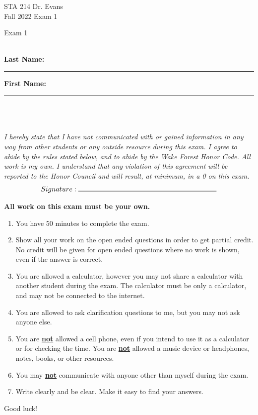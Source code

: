 \documentclass[11pt]{article}
\newcommand{\hl}[1]{\textbf{\underline{#1}}}
\begin{document}
\begin{titlepage}

\enlargethispage{\baselineskip}


STA 214 \hfill Dr. Evans \\
Fall 2022	\hfill Exam 1\\

\vspace{-2cm}

\begin{center}
{\Huge Exam 1}	
\end{center}

$\:$ \\

\textbf{Last Name:} \rule{5cm}{0.5pt}	\hfill	 \textbf{First Name:}  \rule{5cm}{0.5pt}	 \\
$\:$ \\
$\:$ \\

\textit{I hereby state that I have not communicated with or gained information in any way from other students or any outside resource during this exam. I agree to abide by the rules stated below, and to abide by the Wake Forest Honor Code. All work is my own. I understand that any violation of this agreement will be reported to the Honor Council and will result, at minimum, in a 0 on this exam.}
\[ Signature: \rule{7cm}{0.5pt}\]

\hdashrule[0.5ex]{\textwidth}{0.5pt}{3mm}

\textbf{All work on this exam must be your own.}

{\small
\begin{enumerate}
\item You have 50 minutes to complete the exam.
\item Show all your work on the open ended questions in order to get partial credit. No credit will be given for open ended questions where no work is shown, even if the answer is correct.
\item You are allowed a calculator, however you may not share a calculator with another student during the exam. The calculator must be only a calculator, and may not be connected to the internet. 
\item You are allowed to ask clarification questions to me, but you may not ask anyone else. 
\item You are \hl{not} allowed a cell phone, even if you intend to use it as a calculator or for checking the time. You are \hl{not} allowed a music device or headphones, notes, books, or other resources. 
\item You may \hl{not} communicate with anyone other than myself during the exam.
\item Write clearly and be clear. Make it easy to find your answers. 
\end{enumerate}
}
\begin{center}
{\Large Good luck!}
\end{center}
\hdashrule[0.5ex]{\textwidth}{0.5pt}{3mm}


\end{titlepage}
\end{document}
